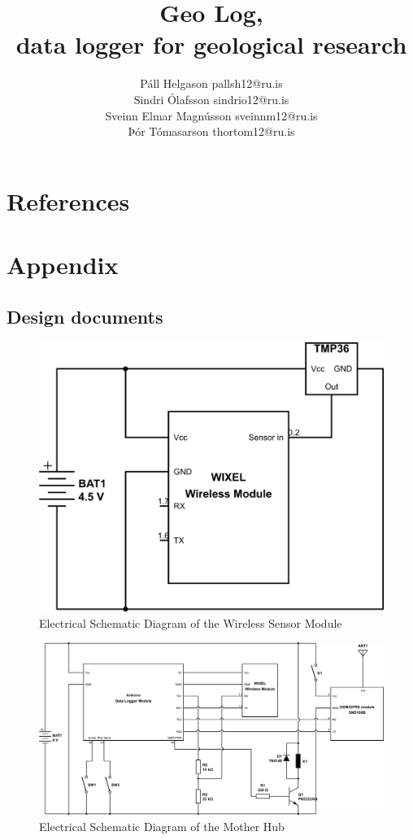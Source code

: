 \documentclass[12pt, svn, draft]{rureport}
\author{Páll Helgason pallsh12@ru.is\\Sindri Ólafsson sindrio12@ru.is\\Sveinn Elmar Magnússon sveinnm12@ru.is\\Þór Tómasarson thortom12@ru.is}  %
\title{Geo Log,\\ \large{data logger for geological research}}  %
\begin{document}
\maketitle  %
\tableofcontents
\pagebreak


\pagebreak








\section{References}

\section{Appendix}
\subsection{Design documents}

\begin{figure}
\centering
\includegraphics[width=0.5\linewidth]{graphics/sensormodule_schematic}
\caption{Electrical Schematic Diagram of the Wireless Sensor Module\label{fig:sensormodule_schematic}}
\end{figure}

\begin{figure}
\centering
\includegraphics[width=1\linewidth]{graphics/motherhub_schematic}
\caption{Electrical Schematic Diagram of the Mother Hub\label{fig:motherhub_schematic}}
\end{figure}
\end{document}

